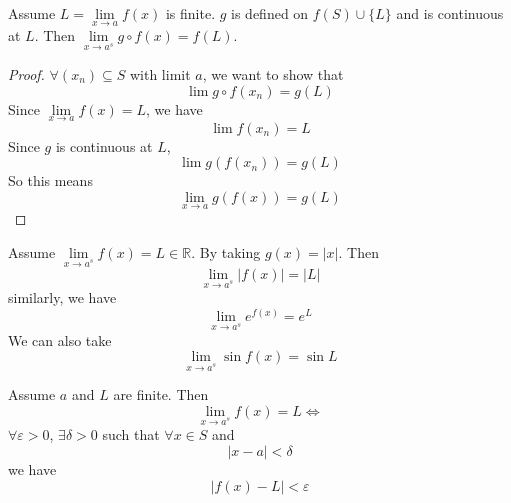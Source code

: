 \documentclass{report}
\begin{document}
\begin{theorem}{20.5}
    Assume $L = \lim\limits_{x \to a}f(x)$ is finite. $g$ is defined on $f(S) \cup \{L\}$ and is continuous at $L$. Then $\lim\limits_{x \to a^{s}}g\circ f(x) = f(L)$.
\end{theorem}
    \begin{proof}
        $\forall (x_{n})\subseteq S$ with limit $a$, we want to show that 
            \begin{equation*}
                \lim g \circ f(x_{n}) = g(L)
            \end{equation*}
        Since $\lim\limits_{x \to a}f(x) = L$, we have
            \begin{equation*}
                \lim f(x_{n}) = L
            \end{equation*}
        Since $g$ is continuous at $L$, 
            \begin{equation*}
                \lim g(f(x_{n})) = g(L)
            \end{equation*}
        So this means
            \begin{equation*}
                \lim\limits_{x \to a}g(f(x)) = g(L)
            \end{equation*}
    \end{proof}

\begin{examples}
    \begin{example}
        Assume $\lim\limits_{x \to a^{s}}f(x) = L \in \mathbb{R}$. By taking $g(x) = \lvert x \rvert$. Then  
            \begin{equation*}
                \lim\limits_{x \to a^{s}}\lvert f(x) \rvert = \lvert L \rvert
            \end{equation*}
        similarly, we have
            \begin{equation*}
                \lim\limits_{x \to a^{s}}e^{f(x)} = e^{L}
            \end{equation*}
        We can also take
            \begin{equation*}
                \lim\limits_{x \to a^{s}}\sin{f(x)} = \sin{L}
            \end{equation*}
    \end{example}
\end{examples}

\begin{theorem}{20.6}
    Assume $a$ and $L$ are finite. Then
        \begin{equation*}
            \lim\limits_{x \to a^{s}}f(x) = L \iff 
        \end{equation*}
    $\forall \varepsilon> 0$, $\exists \delta> 0$ such that $\forall x \in S$ and 
        \begin{equation*}
            \lvert x - a \rvert < \delta
        \end{equation*}
    we have
        \begin{equation*}
            \lvert f(x) - L \rvert < \varepsilon
        \end{equation*}
\end{theorem}
\end{document}
